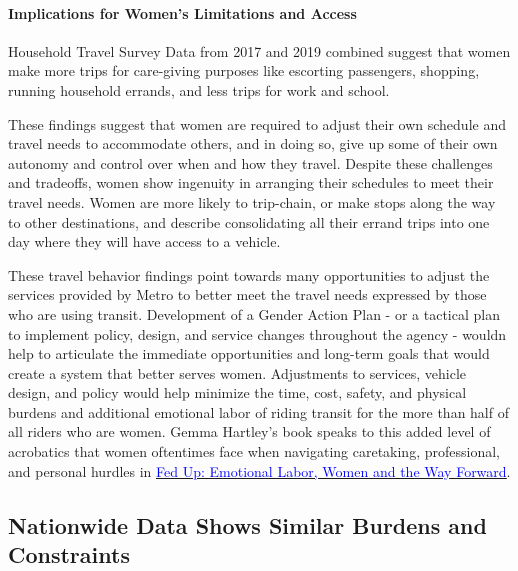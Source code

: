 \documentclass[
  12pt,
]{article}
\begin{document}
\begin{flushleft}
\hypertarget{implications-for-womens-limitations-and-access}{%
\paragraph{Implications for Women's Limitations and
Access}\label{implications-for-womens-limitations-and-access}}

\begin{flushleft}
Household Travel Survey Data from 2017 and 2019 combined suggest that women make more trips for care-giving purposes like escorting passengers, shopping, running household errands, and less trips for work and school.

These findings suggest that women are required to adjust their own schedule and travel needs to accommodate others, and in doing so, give up some of their own autonomy and control over when and how they travel. Despite these challenges and tradeoffs, women show ingenuity in arranging their schedules to meet their travel needs. Women are more likely to trip-chain, or make stops along the way to other destinations, and describe consolidating all their errand trips into one day where they will have access to a vehicle.

These travel behavior findings point towards many opportunities to adjust the services provided by Metro to better meet the travel needs expressed by those who are using transit. Development of a Gender Action Plan - or a tactical plan to implement policy, design, and service changes throughout the agency - wouldn help to articulate the immediate opportunities and long-term goals that would create a system that better serves women. Adjustments to services, vehicle design, and policy would help minimize the time, cost, safety, and physical burdens and additional emotional labor of riding transit for the more than half of all riders who are women. Gemma Hartley's book speaks to this added level of acrobatics that women oftentimes face when navigating caretaking, professional, and personal hurdles in \href{https://www.gemmahartley.com/}{\underline{\textcolor{blue}{Fed Up: Emotional Labor, Women and the Way Forward}}}.
\end{flushleft}

\newpage
\setlength{\headheight}{10pt}
\setlength{\textheight}{665pt}
\fancyhead[L]{}

\hypertarget{nationwide-data-shows-similar-burdens-and-constraints}{%
\subsection{Nationwide Data Shows Similar Burdens and
Constraints}\label{nationwide-data-shows-similar-burdens-and-constraints}}


\end{flushleft}
\end{document}
